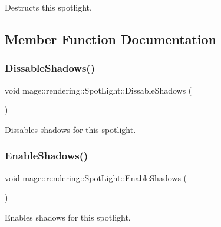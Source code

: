 Destructs this spotlight. 

\subsection{Member Function Documentation}
\hypertarget{classmage_1_1rendering_1_1_spot_light_a11897283e223ed345a2d04738e7fc267}{}\label{classmage_1_1rendering_1_1_spot_light_a11897283e223ed345a2d04738e7fc267} 
\subsubsection{\texorpdfstring{Dissable\+Shadows()}{DissableShadows()}}
{\footnotesize\ttfamily void mage\+::rendering\+::\+Spot\+Light\+::\+Dissable\+Shadows (\begin{DoxyParamCaption}{ }\end{DoxyParamCaption})\hspace{0.3cm}{\ttfamily [noexcept]}}

Dissables shadows for this spotlight. \hypertarget{classmage_1_1rendering_1_1_spot_light_ace198989b91c5b4ca590dabef5b88e25}{}\label{classmage_1_1rendering_1_1_spot_light_ace198989b91c5b4ca590dabef5b88e25} 
\subsubsection{\texorpdfstring{Enable\+Shadows()}{EnableShadows()}}
{\footnotesize\ttfamily void mage\+::rendering\+::\+Spot\+Light\+::\+Enable\+Shadows (\begin{DoxyParamCaption}{ }\end{DoxyParamCaption})\hspace{0.3cm}{\ttfamily [noexcept]}}

Enables shadows for this spotlight. \hypertarget{classmage_1_1rendering_1_1_spot_light_a09e58c11a2f81de811c4d8e51c5d13c3}{}\label{classmage_1_1rendering_1_1_spot_light_a09e58c11a2f81de811c4d8e51c5d13c3} 
